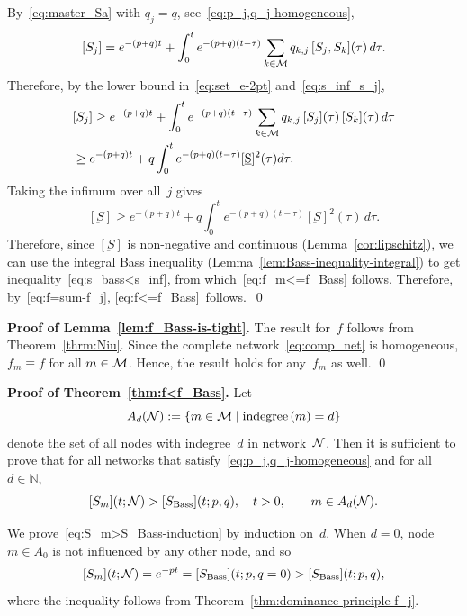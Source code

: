 \documentclass[review]{elsarticle}
\begin{document}
	By~\eqref{eq:master_Sa} with $q_j = q$, see~\eqref{eq:p_j,q_j-homogeneous}, 
	\begin{equation}
		\label{eq:S_j-imtegral-identity-upper-bound}
		[S_j] = e^{-(p+q)t}+\int_0^te^{-(p+q)\left(t-\tau\right)}
		\sum_{k\in \cal M} q_{k,j} \, [S_j,S_k](\tau)\, d\tau .
	\end{equation}
	Therefore,  by the lower bound in~\eqref{eq:set_e-2pt} and~\eqref{eq:s_inf_s_j},
	\begin{eqnarray*}
			&[S_j] \geq e^{-(p+q)t}+\int_0^te^{-(p+q)(t-\tau)}\sum\limits_{k\in \cal M}q_{k,j} \, [S_j](\tau) \, [S_k](\tau) \, d\tau \\
			&\geq e^{-(p+q)t}+q \int_0^te^{-(p+q)(t-\tau)} [\underbar{S}]^2(\tau) d\tau.
	\end{eqnarray*}
	Taking the infimum over all~$j$ gives
	\begin{equation*}
		[\underbar{S}] \geq e^{-(p+q)t}+q \int_0^t e^{-(p+q)(t-\tau)}[\underbar{S}]^2(\tau)\, d\tau.
	\end{equation*}
	Therefore, since $[\underbar{S}]$ is non-negative and continuous (Lemma~\ref{cor:lipschitz}),
	we can use the integral Bass inequality (Lemma~\ref{lem:Bass-inequality-integral})
	to get inequality~\eqref{eq:s_bass<s_inf}, from which~\eqref{eq:f_m<=f_Bass} follows. Therefore, by~\eqref{eq:f=sum-f_j}, 
\eqref{eq:f<=f_Bass}~follows.~\qed


{\bf Proof of Lemma~\ref{lem:f_Bass-is-tight}. }
The result for~$f$ follows from  Theorem~\ref{thrm:Niu}.  Since the complete network~\eqref{eq:comp_net} is homogeneous, 
	$f_m \equiv f$ for all $m \in \cal M$. Hence, the result holds for any~$f_m$ as well. \qed




{\bf Proof of Theorem~\ref{thm:f<f_Bass}. }
	Let 
$$
A_{d}({\cal N}):= \{m \in {\cal M} \mid \text{indegree}\left(m\right)=d \}
$$
denote  the set of all nodes with
indegree~$d$ in network~${\cal N}$. Then it is sufficient to prove that for all networks 
that satisfy~\eqref{eq:p_j,q_j-homogeneous}  and for all $d \in \mathbb{N}$, 
\begin{equation}
	\label{eq:S_m>S_Bass-induction}
	[S_m](t;{\cal N}) > [S_{\rm Bass}](t;p,q), \quad t>0, \qquad m \in A_d({\cal N}).
\end{equation}

We prove~\eqref{eq:S_m>S_Bass-induction} by induction on~$d$. 
When $d=0$, node $m \in A_0$ is not influenced by any other node, and so 
\begin{equation}
	\label{eq:e^-pt>S_Bass}
	[S_m](t;{\cal N})= e^{-pt}   =[S_{\rm Bass}](t;p,q=0)
	> [S_{\rm Bass}](t;p,q),
\end{equation}
where the inequality follows from Theorem~\ref{thm:dominance-principle-f_j}.
\end{document}
